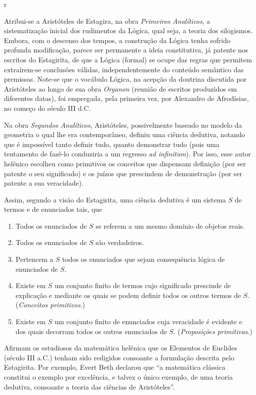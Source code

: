 r\documentclass{hipatia}
\begin{document}
Atribui-se a Aristóteles de Estagira, na obra \emph{Primeiros Analíticos}, a sistematização inicial dos rudimentos da Lógica, qual seja, a teoria dos silogismos. Embora, com o descenso dos tempos, a construção da Lógica tenha sofrido profunda modificação, parece ser permanente a ideia constitutiva, já patente nos escritos do Estagirita, de que a Lógica (formal) se ocupe das regras que permitem extraírem-se conclusões válidas, independentemente do conteúdo semântico das premissas. Note-se que o vocábulo Lógica, na acepção da doutrina discutida por Aristóteles ao longo de sua obra \emph{Organon} (reunião de escritos produzidos em diferentes datas), foi empregada, pela primeira vez, por Alexandro de Afrodísias, no começo do século III d.C. 

Na obra \emph{Segundos Analíticos}, Aristóteles, possivelmente baseado no modelo da geometria o qual lhe era contemporâneo, definiu uma ciência dedutiva, notando que é impossível tanto definir tudo, quanto demonstrar tudo  (pois uma tentamento de fazê-lo conduziria a um regresso \emph{ad infinitum}). Por isso, esse autor helênico escolheu como primitivos os conceitos que dispensam definição  (por ser patente o seu significado)  e os juízos que prescindem de demonstração  (por ser patente a sua veracidade). 

Assim, segundo a visão do Estagirita, uma ciência dedutiva é um sistema $S$ de termos e de enunciados tais, que
\begin{enumerate}
    \item Todos os enunciados de $S$ se referem a um mesmo domínio de objetos reais.
    \item Todos os enunciados de $S$ são verdadeiros.   
      
\item Pertencem a $S$ todos os enunciados que sejam consequência lógica de enunciados de $S$.
\item Existe em $S$ um conjunto finito de termos cujo significado prescinde de explicação e mediante os quais se podem definir todos os outros termos de $S$. (\emph{Conceitos primitivos}.) 
\item Existe em $S$ um conjunto finito de enunciados cuja veracidade é evidente e dos quais decorram todos os outros enunciados de $S$.  (\emph{Proposições primitivas}.)   \cite{costa1994}
\end{enumerate}

Afirmam os estudiosos da matemática helênica que os Elementos de Euclides  (século III a.C.)  tenham sido redigidos consoante a formulação descrita pelo Estagirita. Por exemplo, Evert Beth declarou que ``a matemática clássica constitui o exemplo por excelência, e talvez o único exemplo, de uma teoria dedutiva, consoante a teoria das ciências de Aristóteles''. \cite{beth1955}
\end{document}
